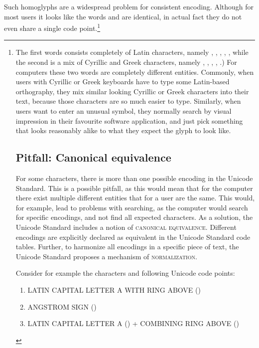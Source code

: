 {{{{{{{{{{{{{{{{{{{{{{{{{{Such homoglyphs are a widespread problem for consistent encoding. Although for most users it looks like the words and are identical, in actual fact they do not even share a single code point.\footnote{The first words consists completely of Latin characters, namely , , , , , while the second is a mix of Cyrillic and Greek characters, namely , , , , .) For computers these two words are completely different entities. Commonly, when users with Cyrillic or Greek keyboards have to type some Latin-based orthography, they mix similar looking Cyrillic or Greek characters into their text, because those characters are so much easier to type. Similarly, when users want to enter an unusual symbol, they normally search by visual impression in their favourite software application, and just pick something that looks reasonably alike to what they expect the glyph to look like.

\subsection{Pitfall: Canonical equivalence}\label{pitfall-canonical-equivalence}

For some characters, there is more than one possible encoding in the Unicode Standard. This is a possible pitfall, as this would mean that for the computer there exist multiple different entities that for a user are the same. This would, for example, lead to problems with searching, as the computer would search for specific encodings, and not find all expected characters. As a solution, the Unicode Standard includes a notion of \textsc{canonical equivalence}. Different encodings are explicitly declared as equivalent in the Unicode Standard code tables. Further, to harmonize all encodings in a specific piece of text, the Unicode Standard proposes a mechanism of \textsc{normalization}.

Consider for example the characters and following Unicode code points:
\begin{enumerate}
	\def\labelenumi{\arabic{enumi}.} 
	\item LATIN CAPITAL LETTER A WITH RING ABOVE () 
	\item ANGSTROM SIGN () 
	\item LATIN CAPITAL LETTER A () + COMBINING RING ABOVE () 
\end{enumerate}

}}}}}}}}}}}}}}}}}}}}}}}}}}}
